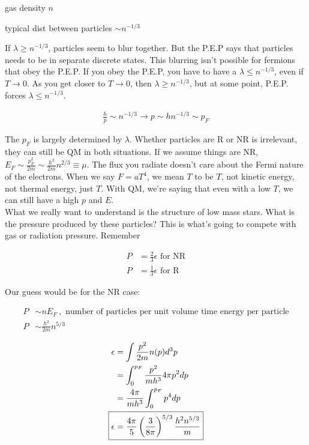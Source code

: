 \documentclass[10pt,letterpaper,final]{book}
\newcommand{\rp}{\right)}
\newcommand{\lp}{\left(}
\begin{document}
\begin{list}{}{}
\item gas density $n$
\item typical dist between particles $\sim n^{-1/3}$
\end{list}

If $\lambda \geq n^{-1/3}$, particles seem to blur together. But the P.E.P says that particles needs to be in separate discrete states. This blurring isn't possible for fermions that obey the P.E.P. If you obey the P.E.P, you have to have a $\lambda \leq n^{-1/3}$, even if $T \rightarrow 0$. As you get closer to $T \rightarrow 0$, then $\lambda \geq n^{-1/3}$, but at some point, P.E.P. forces $\lambda \leq n^{-1/3}$. 

\begin{align}
\frac{h}{p}\sim n^{-1/3} \rightarrow p \sim hn^{-1/3} \sim p_F
\end{align}

The $p_F$ is largely determined by $\lambda$. Whether particles are R or NR is irrelevant, they can still be QM in both situations. If we assume things are NR, $E_F \sim \frac{p_F^2}{2m		} \sim \frac{h^2}{2m} n^{2/3} \equiv \mu$. The flux you radiate doesn't care about the Fermi nature of the electrons. When we say $F = aT^4$, we mean $T$ to be $T$, not kinetic energy, not thermal energy, just $T$. With QM, we're saying that even with a low $T$, we can still have a high $p$ and $E$. \\

What we really want to understand is the structure of low mass stars. What is the pressure produced by these particles? This is what's going to compete with gas or radiation pressure. Remember

\begin{align}
P &= \frac{2}{3} \epsilon\text{ for NR} \\
P &= \frac{1}{3} \epsilon \text{ for R}
\end{align}

Our guess would be for the NR case:

\begin{align}
P  &\sim n E_F~,\text{ number of particles per unit volume time energy per particle}\\
P &\sim \frac{h^2}{2m}n^{5/3}
\end{align}

\begin{align}
\epsilon &= \int \frac{p^2}{2m}n(p) d^3p\\
&= \int_0^{p_F} \frac{p^2}{mh^3}4 \pi p^2 dp \\
&= \frac{4 \pi}{mh^3} \int_0^{p_F} p^4 dp\\
\Aboxed{\epsilon &= \frac{4 \pi}{5} \lp \frac{3}{8 \pi} \rp^{5/3} \frac{h^2 n^{5/3}}{m}}
\end{align}
\end{document}
